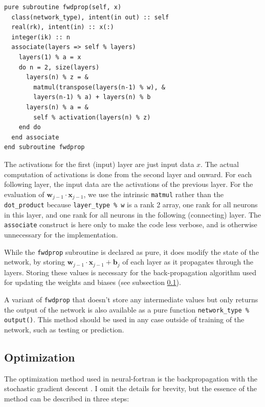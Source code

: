 \documentclass[sigplan, review=false, screen=true, balance=true]{acmart}
\begin{document}
\begin{lstlisting}[caption={A subroutine to perform the forward propagation of the network, and store intermediate activations for later use.}, captionpos=b, label={fwdprop_listing}]
pure subroutine fwdprop(self, x)
  class(network_type), intent(in out) :: self
  real(rk), intent(in) :: x(:)
  integer(ik) :: n
  associate(layers => self % layers)
    layers(1) % a = x
    do n = 2, size(layers)
      layers(n) % z = &
        matmul(transpose(layers(n-1) % w), &
        layers(n-1) % a) + layers(n) % b
      layers(n) % a = &
        self % activation(layers(n) % z)
    end do
  end associate
end subroutine fwdprop
\end{lstlisting}

The activations for the first (input) layer are just input data $x$. The actual
computation of activations is done from the second layer and onward. For each
following layer, the input data are the activations of the previous layer.
For the evaluation of $\mathbf{w}_{j-1} \cdot \mathbf{x}_{j-1}$, we use
the intrinsic \lstinline{matmul} rather than the \lstinline{dot_product}
because \lstinline{layer_type % w} is a rank 2 array, one rank for all neurons
in this layer, and one rank for all neurons in the following (connecting) layer.
The \lstinline{associate} construct is here only to make the code
less verbose, and is otherwise unnecessary for the implementation.

While the \lstinline{fwdprop} subroutine is declared as pure, it does modify
the state of the network, by storing $\mathbf{w}_{j-1} \cdot \mathbf{x}_{j-1} + \mathbf{b}_j$
of each layer as it propagates through the layers. Storing these values is
necessary for the back-propagation algorithm used for updating the weights and
biases (see subsection \ref{backprop}).

A variant of \lstinline{fwdprop} that doesn't store any intermediate values
but only returns the output of the network is also available as a pure function
\lstinline{network_type % output()}. This method should be used in any case outside
of training of the network, such as testing or prediction.

\subsection{Optimization} \label{backprop}

The optimization method used in neural-fortran is the backpropagation with the
stochastic gradient descent \citep{rumelhart86}. I omit the details for brevity,
but the essence of the method can be described in three steps:
\end{document}
